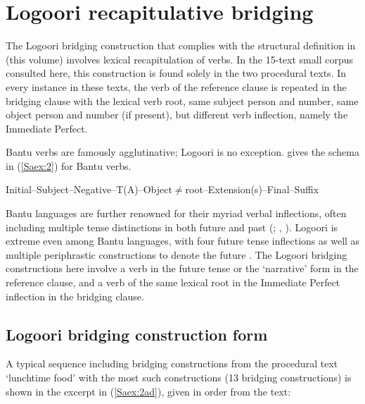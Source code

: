\documentclass[output=paper]{LSP/langsci}
\begin{document}
\section{Logoori recapitulative bridging}
\label{Sarecap.bridg}
The Logoori bridging construction that complies with the structural definition in \citeauthor{guerin18} (this volume) involves lexical recapitulation of verbs. In the 15-text small corpus consulted here, this construction is found solely in the two procedural texts. In every instance in these texts, the verb of the reference clause is repeated in the bridging clause with the lexical verb root, same subject person and number, same object person and number (if present), but different verb inflection, namely the Immediate Perfect. 

Bantu verbs are famously agglutinative; Logoori is no exception. \citet[][90]{Nurse2003} gives the schema in (\ref{Saex:2}) for Bantu verbs.

\begin{exe}
	\ex	\label{Saex:2}
		\glt	Initial--Subject--Negative--T(A)--Object$\neq$root--Extension(s)--Final--Suffix
\end{exe}


Bantu languages are further renowned for their myriad verbal inflections, often including multiple tense distinctions in both future and past (\citealt{Botne2008}; \citealt{Nurse2003}, \citealt{Nurse2008}). Logoori is extreme even among Bantu languages, with four future tense inflections as well as multiple periphrastic constructions to denote the future \citep{Sarvasy2016}. The Logoori bridging constructions here involve a verb in the future tense or the `narrative' form in the reference clause, and a verb of the same lexical root in the Immediate Perfect inflection in the bridging clause. 
%
\subsection{Logoori bridging construction form}
\label{Sa21form}
A typical sequence including bridging constructions from the procedural text `lunchtime food' \citep{Chesi2014} with the most such constructions (13 bridging constructions) is shown in the excerpt in (\ref{Saex:2ad}), given in order from the text:
\end{document}
